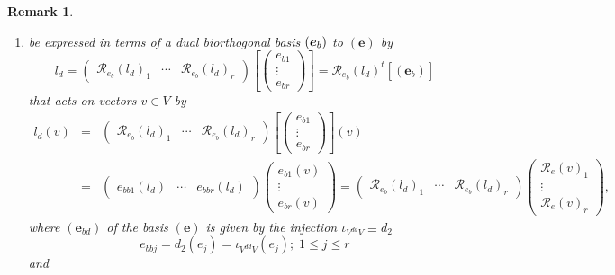 \documentclass[aps,preprint]{revtex4}
\newtheorem{remark}[theorem]{Remark}
\begin{document}
\begin{remark}
\begin{enumerate}
\item be expressed in terms of a dual biorthogonal basis $\left( \boldsymbol{%
e}_{b}\right) $ to $\left( \boldsymbol{e}\right) $ by 
\begin{equation}
l_{d}=\left( 
\begin{array}{ccc}
\mathcal{R}_{e_{b}}\left( l_{d}\right) _{1} & \cdots & \mathcal{R}%
_{e_{b}}\left( l_{d}\right) _{r}%
\end{array}%
\right) \left[ \left( 
\begin{array}{c}
e_{b1} \\ 
\vdots \\ 
e_{br}%
\end{array}%
\right) \right] =\mathcal{R}_{e_{b}}\left( l_{d}\right) ^{t}\left[ \overset{}%
{\left( \boldsymbol{e}_{b}\right) }\right]
\end{equation}%
that acts on vectors $v\in V$ by 
\begin{eqnarray}
l_{d}\left( v\right) &=&\left( 
\begin{array}{ccc}
\mathcal{R}_{e_{b}}\left( l_{d}\right) _{1} & \cdots & \mathcal{R}%
_{e_{b}}\left( l_{d}\right) _{r}%
\end{array}%
\right) \left[ \left( 
\begin{array}{c}
e_{b1} \\ 
\vdots \\ 
e_{br}%
\end{array}%
\right) \right] \left( \overset{}{v}\right) \\
&=&\left( 
\begin{array}{ccc}
e_{bb1}\left( l_{d}\right) & \cdots & e_{bbr}\left( l_{d}\right)%
\end{array}%
\right) \left( 
\begin{array}{c}
e_{b1}\left( v\right) \\ 
\vdots \\ 
e_{br}\left( v\right)%
\end{array}%
\right) =\left( 
\begin{array}{ccc}
\mathcal{R}_{e_{b}}\left( l_{d}\right) _{1} & \cdots & \mathcal{R}%
_{e_{b}}\left( l_{d}\right) _{r}%
\end{array}%
\right) \left( 
\begin{array}{c}
\mathcal{R}_{e}\left( v\right) _{1} \\ 
\vdots \\ 
\mathcal{R}_{e}\left( v\right) _{r}%
\end{array}%
\right) ,
\end{eqnarray}%
where 
$\left( \boldsymbol{e}_{bd}\right) $ of the basis $\left( \boldsymbol{e}%
\right) $ is given by the injection $\iota _{V^{dd}V}\equiv d_{2}$ 
\begin{equation}
e_{bbj}=d_{2}\left( e_{j}\right) =\iota _{V^{dd}V}\left( e_{j}\right)
;\;1\leq j\leq r
\end{equation}%
and


\end{enumerate}
\end{remark}
\end{document}

